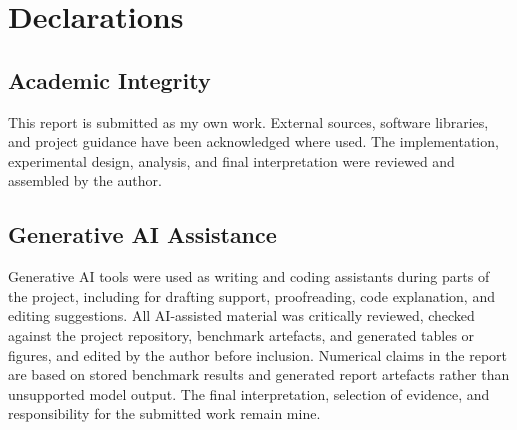 \chapter*{Declarations}

\section*{Academic Integrity}

This report is submitted as my own work. External sources, software libraries,
and project guidance have been acknowledged where used. The implementation,
experimental design, analysis, and final interpretation were reviewed and
assembled by the author.

\section*{Generative AI Assistance}

Generative AI tools were used as writing and coding assistants during parts of
the project, including for drafting support, proofreading, code explanation,
and editing suggestions. All AI-assisted material was critically reviewed,
checked against the project repository, benchmark artefacts, and generated
tables or figures, and edited by the author before inclusion. Numerical claims
in the report are based on stored benchmark results and generated report
artefacts rather than unsupported model output. The final interpretation,
selection of evidence, and responsibility for the submitted work remain mine.
